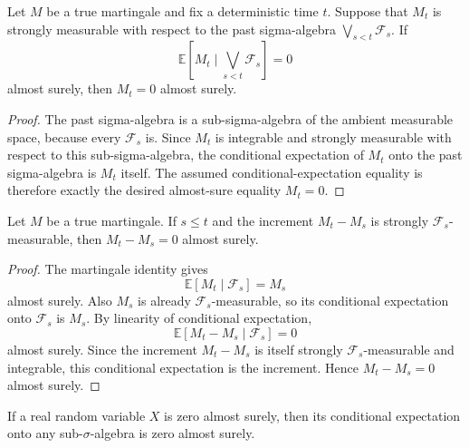 \begin{lemma}\label{lem:Martingale.eq_zero_of_predictable_finiteVariation_past_measurable_value}
Let \(M\) be a true martingale and fix a deterministic time \(t\).  Suppose
that \(M_t\) is strongly measurable with respect to the past sigma-algebra
\(\bigvee_{s<t}\mathcal F_s\).  If
\[
  \mathbb E[M_t\mid \bigvee_{s<t}\mathcal F_s]=0
\]
almost surely, then \(M_t=0\) almost surely.
\end{lemma}

\begin{proof}
The past sigma-algebra is a sub-sigma-algebra of the ambient measurable
space, because every \(\mathcal F_s\) is.  Since \(M_t\) is integrable and
strongly measurable with respect to this sub-sigma-algebra, the conditional
expectation of \(M_t\) onto the past sigma-algebra is \(M_t\) itself.  The
assumed conditional-expectation equality is therefore exactly the desired
almost-sure equality \(M_t=0\).
\end{proof}


\begin{lemma}\label{lem:Martingale.eq_zero_of_predictable_finiteVariation_past_measurable_zero_increment}
Let \(M\) be a true martingale.  If \(s\le t\) and the increment
\(M_t-M_s\) is strongly \(\mathcal F_s\)-measurable, then
\(M_t-M_s=0\) almost surely.
\end{lemma}

\begin{proof}
The martingale identity gives
\[
  \mathbb E[M_t\mid\mathcal F_s]=M_s
\]
almost surely.  Also \(M_s\) is already \(\mathcal F_s\)-measurable, so its
conditional expectation onto \(\mathcal F_s\) is \(M_s\).  By linearity of
conditional expectation,
\[
  \mathbb E[M_t-M_s\mid\mathcal F_s]=0
\]
almost surely.  Since the increment \(M_t-M_s\) is itself strongly
\(\mathcal F_s\)-measurable and integrable, this conditional expectation is
the increment.  Hence \(M_t-M_s=0\) almost surely.
\end{proof}


\begin{lemma}\label{lem:condExp_ae_eq_zero_of_ae_eq_zero}
If a real random variable \(X\) is zero almost surely, then its conditional
expectation onto any sub-\(\sigma\)-algebra is zero almost surely.
\end{lemma}

